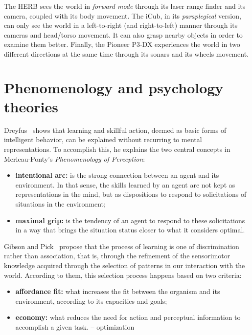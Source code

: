 \documentclass{article}
\begin{document}
The HERB sees the world in \emph{forward mode} through its laser range finder
and its camera, coupled with its body movement. The iCub, in its
\emph{paraplegical} version, can only see the world in a left-to-right (and
right-to-left) manner through its cameras and head/torso movement. It can also
grasp nearby objects in order to examine them better. Finally, the Pioneer P3-DX
experiences the world in two different directions at the same time through its
sonars and its wheels movement. 


\section{Phenomenology and psychology theories}


Dreyfus~\cite{dreyfus2002} shows that learning and skillful action, deemed as
basic forms of intelligent behavior, can be explained without recurring to
mental representations. To accomplish this, he explains the two central concepts
in Merleau-Ponty's \emph{Phenomenology of Perception}:

\begin{itemize}
\item \textbf{intentional arc:} is the strong connection between an agent and
its environment. In that sense, the skills learned by an agent are not kept as
representations in the mind, but as dispositions to respond to solicitations of
situations in the environment;
\item \textbf{maximal grip:} is the tendency of an agent to respond to these
solicitations in a way that brings the situation status closer to what it
considers optimal.
\end{itemize}

Gibson and Pick~\cite{gibson2000} propose that the process of learning is one of
discrimination rather than association, that is, through the refinement of the
sensorimotor knowledge acquired through the selection of patterns in our
interaction with the world. According to them, this selection process happens
based on two criteria:


\begin{itemize}
\item \textbf{affordance fit:} what increases the fit between the organism and
its environment, according to its capacities and goals;
\item \textbf{economy:} what reduces the need for action and perceptual
information to accomplish a given task. -- optimization
\end{itemize}
\end{document}
